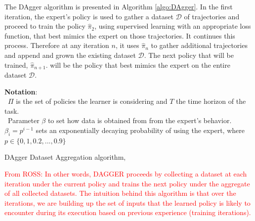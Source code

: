 \documentclass{article}
\begin{document}
The DAgger algorithm is presented in Algorithm \ref{algo:DAgger}. In the first iteration, the expert's policy is used to gather a dataset $\mathcal{D}$ of trajectories and proceed to train the policy $\hat{\pi}_2$, using supervised learning with an appropriate loss function, that best mimics the expert on those trajectories. It continues this process. Therefore at any iteration $n$, it uses $\hat{\pi}_n$ to gather additional trajectories and append and grown the existing dataset $\mathcal{D}$. The next policy that will be trained, $\hat{\pi}_{n+1}$. will be the policy that best mimics the expert on the entire dataset $\mathcal{D}$.

\noindent \textbf{Notation}:\\
\textbullet\ \quad $\Pi$ is the set of policies the learner is considering and $T$ the time horizon of the task.\\
\textbullet\ \quad Parameter $\beta$ to set how data is obtained from from the expert's behavior. $\beta_i = p^{i-1}$ sets an exponentially decaying probability of using the expert, where $p \in \{0,1, 0.2, ..., 0.9\}$\\

\begin{algorithm}
\onehalfspacing
\caption{DAgger Dataset Aggregation algorithm, \citep{Dagger-Ross2010}}\label{algo:DAgger}
\begin{algorithmic}[1]
	\EndFor
\end{algorithmic} 
\end{algorithm}

\textcolor{red}{From ROSS: In other words, DAGGER proceeds by collecting a dataset 	at each iteration under the current policy and trains the next 	policy under the aggregate of all collected datasets. The intuition 	behind this algorithm is that over the iterations, we 	are building up the set of inputs that the learned policy is 	likely to encounter during its execution based on previous experience (training iterations).}
\end{document}
